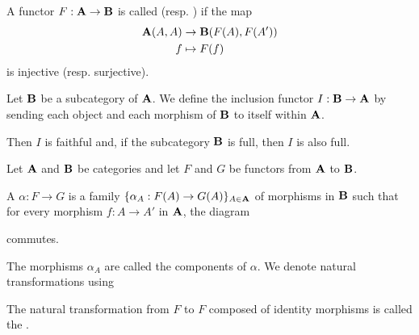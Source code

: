 \begin{definition}\label{def:faithful_full_functor}\cite[definition 1.2.16]{Leinster2014}
  A functor \( F: \operatorname{\mathbf{A}} \to \operatorname{\mathbf{B}} \) is called  (resp. ) if the map
  \begin{align*}
    \operatorname{\mathbf{A}}(A, A) &\to \operatorname{\mathbf{B}}(F(A), F(A')) \\
    f &\mapsto F(f)
  \end{align*}
  is injective (resp. surjective).
\end{definition}

\begin{example}\label{def:subcategory_functors}\cite[25]{Leinster2014}
  Let \( \operatorname{\mathbf{B}} \) be a subcategory of \( \operatorname{\mathbf{A}} \). We define the inclusion functor \( I: \operatorname{\mathbf{B}} \to \operatorname{\mathbf{A}} \) by sending each object and each morphism of \( \operatorname{\mathbf{B}} \) to itself within \( \operatorname{\mathbf{A}} \).

  Then \( I \) is faithful and, if the subcategory \( \operatorname{\mathbf{B}} \) is full, then \( I \) is also full.
\end{example}

\begin{definition}\label{def:natural_transformation}\cite[definition 1.3.1]{Leinster2014}
  Let \( \operatorname{\mathbf{A}} \) and \( \operatorname{\mathbf{B}} \) be categories and let \( F \) and \( G \) be functors from \( \operatorname{\mathbf{A}} \) to \( \operatorname{\mathbf{B}} \).

  A  \( \alpha: F \to G \) is a family \( \{ \alpha_A: F(A) \to G(A) \}_{A \in \operatorname{\mathbf{A}}} \) of morphisms in \( \operatorname{\mathbf{B}} \) such that for every morphism \( f: A \to A' \) in \( \operatorname{\mathbf{A}} \), the diagram
  \begin{Center}
  \end{Center}
  commutes.

  The morphisms \( \alpha_A \) are called the components of \( \alpha \). We denote natural transformations using
  \begin{Center}
  \end{Center}

  The natural transformation from \( F \) to \( F \) composed of identity morphisms is called the .
\end{definition}

